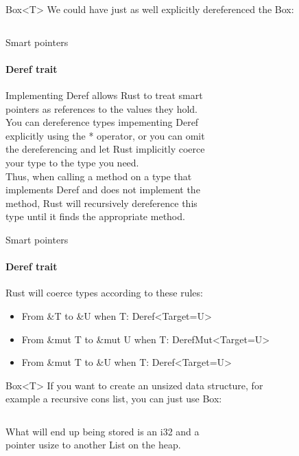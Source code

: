\documentclass[usenames,dvipsnames,10pt,aspectratio=169]{beamer}
\begin{document}
\begin{frame}{Box<T>}
	\large
	We could have just as well explicitly dereferenced the Box:
	\vspace{0.4cm}
	\inputminted[fontsize=\large]{rust}{code/box2.rs}
\end{frame}

\begin{frame}{Smart pointers}
	\framesubtitle{Deref trait}
	\large
Implementing \textcolor{ucuyellow}{Deref} allows Rust to treat smart\\
pointers as references to the values they hold.\\
\vspace{0.4cm}
You can dereference types impementing \textcolor{ucuyellow}{Deref}\\
explicitly using the \textcolor{ucuyellow}{*} operator, or you can omit\\
the dereferencing and let Rust implicitly coerce\\
your type to the type you need.\\
\vspace{0.4cm}
Thus, when calling a method on a type that\\
implements \textcolor{ucuyellow}{Deref} and does not implement the\\
method, Rust will recursively dereference this\\
type until it finds the appropriate method.
\end{frame}

\begin{frame}{Smart pointers}
	\framesubtitle{Deref trait}
	\large
	Rust will coerce types according to these rules:
	
\begin{itemize}[label=$\bullet$]
	\item From \textcolor{ucuyellow}{\&T} to 
		\textcolor{ucuyellow}{\&U} when 
		\textcolor{ucuyellow}{T: Deref<Target=U>}
	\item From \textcolor{ucuyellow}{\&mut T} to
		\textcolor{ucuyellow}{\&mut U} when 
		\textcolor{ucuyellow}{T: DerefMut<Target=U>}
	\item From \textcolor{ucuyellow}{\&mut T} to
		\textcolor{ucuyellow}{\&U} when
		\textcolor{ucuyellow}{T: Deref<Target=U>}
\end{itemize}
\end{frame}

\begin{frame}{Box<T>}
	\large
	If you want to create an unsized data structure, for\\
	example a recursive cons list, you can just use Box:
	\vspace{0.4cm}
	\inputminted[fontsize=\normalsize]{rust}{code/box3.rs}
	\vspace{0.2cm}
	What will end up being stored is an \textcolor{ucuyellow}{i32} and a\\
	pointer \textcolor{ucuyellow}{usize} to another List on the heap.
\end{frame}
\end{document}
